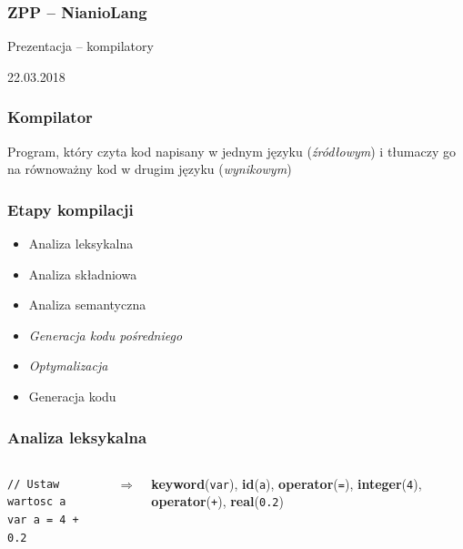 \documentclass{beamer}
\begin{document}
	\begin{frame}
		\frametitle{ZPP -- NianioLang}
		Prezentacja -- kompilatory
		
		22.03.2018
	\end{frame}
	
	\begin{frame}
		\frametitle{Kompilator}
		Program, który czyta kod napisany w jednym języku (\textit{źródłowym})
		i tłumaczy go na równoważny kod w drugim języku (\textit{wynikowym})
	\end{frame}
	
	\begin{frame}
		\frametitle{Etapy kompilacji}
		\begin{itemize}
			\item Analiza leksykalna
			\item Analiza składniowa
			\item Analiza semantyczna
			\item \textit{Generacja kodu pośredniego}
			\item \textit{Optymalizacja}
			\item Generacja kodu
		\end{itemize}
	\end{frame}
	
	\begin{frame}[fragile]
		\frametitle{Analiza leksykalna}
		\begin{columns}
			\begin{column}{0.5\textwidth}
				\newline\newline
			\end{column}
			\begin{column}{0.5\textwidth}
				\newline\newline
			\end{column}
		\end{columns}
		\begin{columns}
			\begin{column}{0.45\textwidth}
				\begin{lstlisting}
// Ustaw wartosc a
var a = 4 + 0.2
				\end{lstlisting}
			\end{column}
			\begin{column}{0.1\textwidth}
$\Rightarrow$
			\end{column}
			\begin{column}{0.45\textwidth}
				\textbf{keyword}(\texttt{var}),\newline
				\textbf{id}(\texttt{a}),\newline
				\textbf{operator}(\texttt{=}),\newline
				\textbf{integer}(\texttt{4}),\newline
				\textbf{operator}(\texttt{+}),\newline
				\textbf{real}(\texttt{0.2})
			\end{column}
		\end{columns}
	\end{frame}
	
\end{document}
